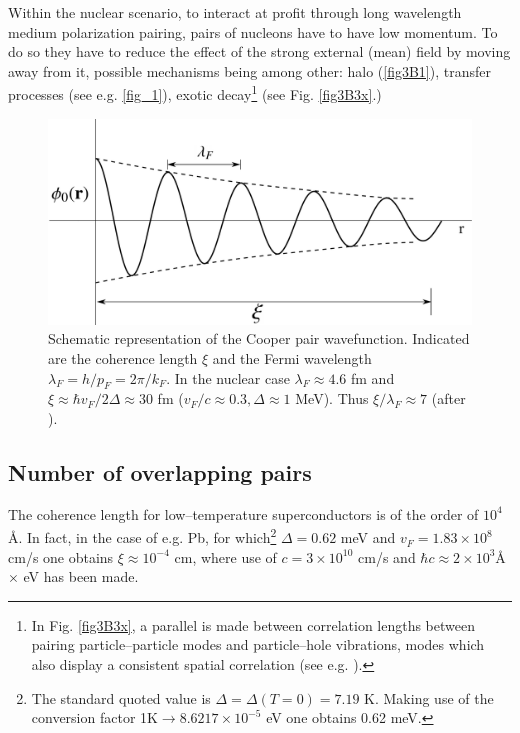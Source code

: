 \begin{subappendices}
     
     Within the nuclear scenario, to interact at profit through long wavelength medium polarization pairing, pairs of nucleons have to have low momentum. To do so they have to reduce the effect of the strong external (mean) field by moving away from it, possible mechanisms being among other: halo (\ref{fig3B1}), transfer processes (see e.g. \ref{fig_1}), exotic decay\footnote{In Fig. \ref{fig3B3x}, a parallel is made between correlation lengths between pairing particle--particle modes and particle--hole vibrations, modes which also display a consistent spatial correlation (see e.g. \cite{Broglia:71}).} (see Fig. \ref{fig3B3x}.)    

 \begin{figure}[h]
 	\centerline{\includegraphics*[width=12cm,angle=0	]{nutshell/figs/fig3B2}}
 	\caption{Schematic representation of the Cooper pair wavefunction. Indicated are the coherence length $\xi$ and the Fermi wavelength $\lambda_F=h/p_F=2\pi/k_F$. In the nuclear case $\lambda_F\approx4.6$ fm and $\xi\approx \hbar v_F/2\Delta\approx30$ fm ($v_F/c\approx0.3, \Delta\approx 1$ MeV). Thus $\xi/\lambda_F\approx 7$ (after \cite{Weisskopf:81}).}\label{fig3B2}
 \end{figure}
 





\subsection{Number of overlapping pairs}
 

The coherence length for low--temperature superconductors is of the order of $10^4$\AA. In fact, in the case of e.g. Pb, for which\footnote{\label{foot75} The standard quoted value is $\Delta=\Delta(T=0)=7.19$ K. Making use of the conversion factor 1K$\rightarrow 8.6217\times10^{-5}$ eV one obtains 0.62 meV.} $\Delta=0.62$ meV and $v_F=1.83\times10^8$ cm/s one obtains $\xi\approx10^{-4}$ cm, where use of $c=3\times10^{10}$ cm/s and $\hbar c\approx 2\times10^3 $\AA$\times$  eV has been made. 



\end{subappendices}
